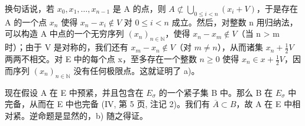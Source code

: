 换句话说，若 \(x_{0}, x_{1}, \ldots, x_{n-1}\) 是 A 的点，则 \(A \not\subset \bigcup_{0 \leqslant i < n} (x_{i} + V)\)，于是存在 A 的一个点 \(x_{n}\) 使得 \(x_{n} - x_{i} \notin V\) 对 \(0 \leqslant i < n\) 成立。然后，对整数 n 用归纳法，可以构造 A 中点的一个无穷序列 \((x_{n})_{n \in \mathbb{N}}\)，使得 \(x_{n} - x_{m} \notin V\)（当 n \textgreater{} m 时）；由于 V 是对称的，我们还有 \(x_{m} - x_{n} \notin V\)（对 \(m \neq n\)），从而诸集 \(x_{n} + \frac{1}{2}V\) 两两不相交。对 E 中的每个点 x，至多存在一个整数 \(n \geqslant 0\) 使得 \(x_{n} \in x + \frac{1}{2}V\)，因而序列 \((x_{n})_{n \in \mathbb{N}}\) 没有任何极限点。这就证明了 a)。

现在假设 A 在 E 中预紧，并且包含在 \(E_{\sigma}\) 的一个紧子集 B 中。那么 B 在 \(E_{\sigma}\) 中完备，从而在 E 中也完备 (IV, 第 5 页, 注记 2)。我们有 \(\overline{A} \subset B\)，故 A 在 E 中相对紧。逆命题是显然的，b) 随之得证。

